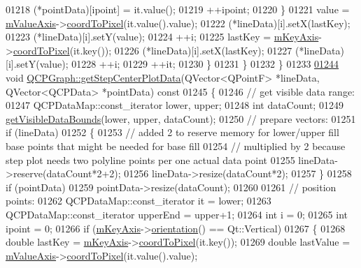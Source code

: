 \begin{DoxyCode}
01218         (*pointData)[ipoint] = it.value();
01219         ++ipoint;
01220       \}
01221       value = \hyperlink{a00024_acfc46d619ab9598be33b64146da45822}{mValueAxis}->\hyperlink{a00025_a985ae693b842fb0422b4390fe36d299a}{coordToPixel}(it.value().value);
01222       (*lineData)[i].setX(lastKey);
01223       (*lineData)[i].setY(value);
01224       ++i;
01225       lastKey = \hyperlink{a00024_a692421b963472fa6e16156a74ba96832}{mKeyAxis}->\hyperlink{a00025_a985ae693b842fb0422b4390fe36d299a}{coordToPixel}(it.key());
01226       (*lineData)[i].setX(lastKey);
01227       (*lineData)[i].setY(value);
01228       ++i;
01229       ++it;
01230     \}
01231   \}
01232 \}
01233 
\hypertarget{a00115_source_l01244}{}\hyperlink{a00031_ac79dc75dd98db9948d9656447b463af5}{01244} \textcolor{keywordtype}{void} \hyperlink{a00031_ac79dc75dd98db9948d9656447b463af5}{QCPGraph::getStepCenterPlotData}(QVector<QPointF> *lineData, 
      QVector<QCPData> *pointData)\textcolor{keyword}{ const}
01245 \textcolor{keyword}{}\{
01246   \textcolor{comment}{// get visible data range:}
01247   QCPDataMap::const\_iterator lower, upper;
01248   \textcolor{keywordtype}{int} dataCount;
01249   \hyperlink{a00031_a8963c90087cf53b889b29dd59aa41aad}{getVisibleDataBounds}(lower, upper, dataCount);
01250   \textcolor{comment}{// prepare vectors:}
01251   \textcolor{keywordflow}{if} (lineData)
01252   \{
01253     \textcolor{comment}{// added 2 to reserve memory for lower/upper fill base points that might be needed for base fill}
01254     \textcolor{comment}{// multiplied by 2 because step plot needs two polyline points per one actual data point}
01255     lineData->reserve(dataCount*2+2);
01256     lineData->resize(dataCount*2);
01257   \}
01258   \textcolor{keywordflow}{if} (pointData)
01259     pointData->resize(dataCount);
01260   
01261   \textcolor{comment}{// position points:}
01262   QCPDataMap::const\_iterator it = lower;
01263   QCPDataMap::const\_iterator upperEnd = upper+1;
01264   \textcolor{keywordtype}{int} i = 0;
01265   \textcolor{keywordtype}{int} ipoint = 0;
01266   \textcolor{keywordflow}{if} (\hyperlink{a00024_a692421b963472fa6e16156a74ba96832}{mKeyAxis}->\hyperlink{a00025_a57483f2f60145ddc9e63f3af53959265}{orientation}() == Qt::Vertical)
01267   \{
01268     \textcolor{keywordtype}{double} lastKey = \hyperlink{a00024_a692421b963472fa6e16156a74ba96832}{mKeyAxis}->\hyperlink{a00025_a985ae693b842fb0422b4390fe36d299a}{coordToPixel}(it.key());
01269     \textcolor{keywordtype}{double} lastValue = \hyperlink{a00024_acfc46d619ab9598be33b64146da45822}{mValueAxis}->\hyperlink{a00025_a985ae693b842fb0422b4390fe36d299a}{coordToPixel}(it.value().value);

\end{DoxyCode}
